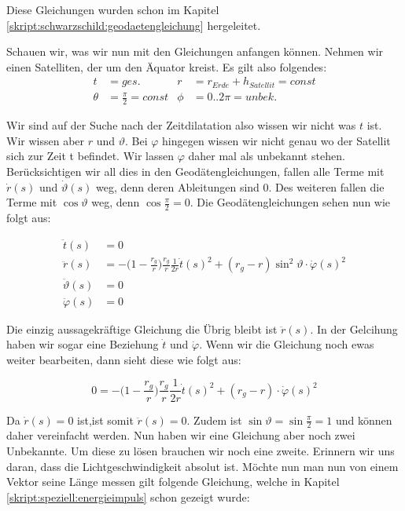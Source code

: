 \begin{refsection}
\noindent{}Diese Gleichungen wurden schon im Kapitel \ref{skript:schwarzschild:geodaetengleichung} hergeleitet. 

Schauen wir, was wir nun mit den Gleichungen anfangen können. Nehmen wir einen Satelliten, der um den Äquator kreist. Es gilt also folgendes: \\

\begin{align*}
t &= ges. &
r &= r_{Erde} + h_{Satellit} = const \\
\theta &= \frac{\pi}{2} = const &
\phi &= 0..2\pi = unbek.
\end{align*}

\noindent{}Wir sind auf der Suche nach der Zeitdilatation also wissen wir nicht was \( t \) ist. Wir wissen aber \(  r \) und \( \vartheta \). Bei \( \varphi \) hingegen wissen wir nicht genau wo der Satellit sich zur Zeit t befindet. Wir lassen \( \varphi \) daher mal als unbekannt stehen. Berücksichtigen wir all dies in den Geodätengleichungen, fallen alle Terme mit \( \dot r(s) \) und \( \dot \vartheta (s) \) weg, denn deren Ableitungen sind 0. Des weiteren fallen die Terme mit \( \cos \vartheta \) weg, denn \( \cos \frac{\pi}{2} = 0 \). Die Geodätengleichungen sehen nun wie folgt aus:

\begin{align*}
\ddot t(s) &= 0 \\
\ddot r(s)
&=
-\biggl(1-\frac{r_g}{r}\biggr)\frac{r_g}{r}\frac1{2r}\dot t(s)^2
+ (r_g-r)\sin^2 \vartheta \cdot \dot \varphi(s)^2 \\
\ddot \vartheta(s) &= 0 \\
\ddot \varphi(s) &= 0
\end{align*}

\noindent{}Die einzig aussagekräftige Gleichung die Übrig bleibt ist \( \ddot r(s) \). In der Gelcihung haben wir sogar eine Beziehung \( \dot t \) und \( \dot \varphi \). Wenn wir die Gleichung noch ewas weiter bearbeiten, dann sieht diese wie folgt aus:

\begin{equation}
0 = -\biggl(1-\frac{r_g}{r}\biggr)\frac{r_g}{r}\frac1{2r}\dot t(s)^2 + (r_g-r)\cdot \dot \varphi(s)^2
\end{equation}

\noindent{}Da \( \dot r(s) = 0 \) ist,ist somit \(  \ddot r(s) = 0 \). Zudem ist \( \sin \vartheta = \sin \frac{\pi}{2} = 1 \) und können daher vereinfacht werden. Nun haben wir eine Gleichung aber noch zwei Unbekannte. Um diese zu lösen brauchen wir noch eine zweite. Erinnern wir uns daran, dass die Lichtgeschwindigkeit absolut ist. Möchte nun man nun von einem Vektor seine Länge messen gilt folgende Gleichung, welche in Kapitel \ref{skript:speziell:energieimpuls} schon gezeigt wurde:


\end{refsection}
